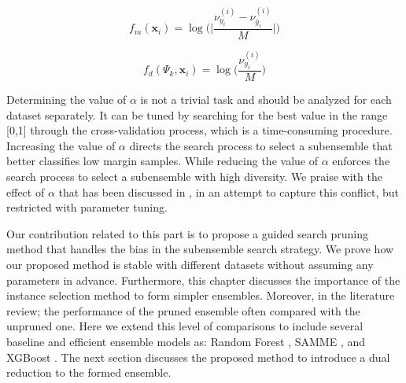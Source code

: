  \begin{equation}
\label{MDEP.margin}
f_m(\textbf{x}_i)= \log{}\Bigg(\Biggl| {\frac{\nu_{y_i}^{(i)}-\nu_{\bar{y}_i}^{(i)}}{{M}}} \Biggl|   \Bigg)
\end{equation}   
 
 \begin{equation}
\label{MDEP.diversity}
f_d(\Psi_{k},\textbf{x}_i)=  \log{}\Bigg( \frac{\nu_{y_i}^{(i)}}{M}    \Bigg)
\end{equation}      
 


Determining the value of $\alpha$ is not a trivial task and should be analyzed for each dataset separately. It can be tuned by searching for the best value in the range [0,1] through the cross-validation process, which is a time-consuming procedure.  Increasing the value of $\alpha$ directs the search process to select a subensemble that better classifies low margin samples. While reducing the value of $\alpha$ enforces the search process to select a subensemble with high diversity. We praise with the effect of $\alpha$ that has been discussed in \cite{guo2018}, in an attempt to capture this conflict, but restricted with parameter tuning.  





Our contribution related to this part is to propose a guided search pruning method that handles the bias in the subensemble search strategy. We prove how our proposed method is stable with different datasets without assuming any parameters in advance. Furthermore, this chapter discusses the importance of the instance selection method to form simpler ensembles. Moreover, in the literature review; the performance of the pruned ensemble often compared with the unpruned one. Here we extend this level of comparisons to include several baseline and efficient ensemble models as: Random Forest \cite{breiman2001}, SAMME \citep{hastie2009}, and XGBoost \citep{chen2016}. The next section discusses the proposed method to introduce a dual reduction to the formed ensemble.  




















